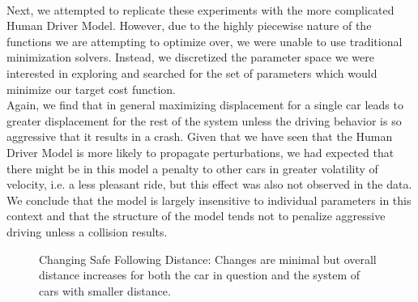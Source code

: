 \documentclass[12pt]{article}
\begin{document}
\paragraph{}Next, we attempted to replicate these experiments with the more complicated Human Driver Model. However, due to the highly piecewise nature of the functions we are attempting to optimize over, we were unable to use traditional minimization solvers. Instead, we discretized the parameter space we were interested in exploring and searched for the set of parameters which would minimize our target cost function. \\
Again, we find that in general maximizing displacement for a single car leads to greater displacement for the rest of the system unless the driving behavior is so aggressive that it results in a crash. Given that we have seen that the Human Driver Model is more likely to propagate perturbations, we had expected that there might be in this model a penalty to other cars in greater volatility of velocity, i.e. a less pleasant ride, but this effect was also not observed in the data. We conclude that the model is largely insensitive to individual parameters in this context and that the structure of the model tends not to penalize aggressive driving unless a collision results.\\
\begin{figure}[H]
  \centering
  \caption{Changing Safe Following Distance: Changes are minimal but overall distance increases for both the car in question and the system of cars with smaller distance.}
\end{figure}
\end{document}
